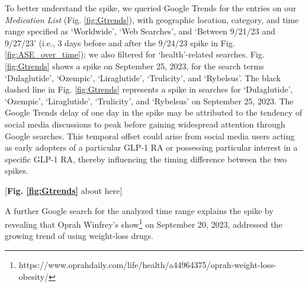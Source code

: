 \documentclass[referee,bst/sn-basic]{sn-jnl}%
\begin{document}
To better understand the spike, we queried Google Trends for the entries on our \textit{Medication List} (Fig. \ref{fig:Gtrends}), with geographic location, category, and time range specified as `Worldwide', `Web Searches', and `Between 9/21/23 and 9/27/23' (i.e., 3 days before and after the 9/24/23 spike in Fig. \ref{fig:ASE_over_time}); we also filtered for `health'-related searches. 
Fig. \ref{fig:Gtrends} shows a spike on September 25, 2023, for the search terms `Dulaglutide', `Ozempic', `Liraglutide', `Trulicity', and `Rybelsus'.
The black dashed line in Fig. \ref{fig:Gtrends} represents a spike in searches for `Dulaglutide', `Ozempic', `Liraglutide', `Trulicity', and `Rybelsus' on September 25, 2023.
The Google Trends delay of one day in the spike may be attributed to the tendency of social media discussions to peak before gaining widespread attention through Google searches.
This temporal offset could arise from social media users acting as early adopters of a particular GLP-1 RA or possessing particular interest in a specific GLP-1 RA, thereby influencing the timing difference between the two spikes.

\begin{center}
    [\textbf{Fig. \ref{fig:Gtrends}} about here]
\end{center}

\begin{comment}

\begin{figure}
    \centering
    \texttt{[image: images/GoogleTrends.pdf]}
    \caption{Google Trends queries for GLP-1 RAs on our \textit{Medication List}.
        } 
    \label{fig:Gtrends}
    \begin{tikzpicture}[remember picture,overlay]
        \draw[black, thick, dashed] (1.95, 3.0) -- (1.95, 8.6); %
    \end{tikzpicture}
\end{figure} 

\end{comment}

A further Google search for the analyzed time range explains the spike by revealing that Oprah Winfrey's show\footnote{https://www.oprahdaily.com/life/health/a44964375/oprah-weight-loss-obesity/} on September 20, 2023, addressed the growing trend of using weight-loss drugs. 


\end{document}
